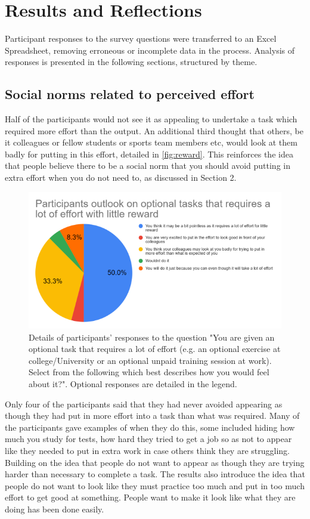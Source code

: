 \documentclass{l4proj}
\begin{document}
\section{Results and Reflections}
Participant responses to the survey questions were transferred to an Excel Spreadsheet, removing erroneous or incomplete data in the process. Analysis of responses is presented in the following sections, structured by theme.

\subsection{Social norms related to perceived effort}

Half of the participants would not see it as appealing to undertake a task which required more effort than the output. An additional third thought that others, be it colleagues or fellow students or sports team members etc, would look at them badly for putting in this effort, detailed in \autoref{fig:reward}. This reinforces the idea that people believe there to be a social norm that you should avoid putting in extra effort when you do not need to, as discussed in Section 2. 

\begin{figure}[h!]
    \centering
    \includegraphics[width=\textwidth]{images/littleReward.png}
        \caption{Details of participants' responses to the question "You are given an optional task that requires a lot of effort (e.g. an optional exercise at college/University or an optional unpaid training session at work). Select from the following which best describes how you would feel about it?". Optional responses are detailed in the legend.}
        \label{fig:reward}
\end{figure}

Only four of the participants said that they had never avoided appearing as though they had put in more effort into a task than what was required. Many of the participants gave examples of when they do this, some included hiding how much you study for tests, how hard they tried to get a job so as not to appear like they needed to put in extra work in case others think they are struggling. Building on the idea that people do not want to appear as though they are trying harder than necessary to complete a task. The results also introduce the idea that people do not want to look like they must practice too much and put in too much effort to get good at something. People want to make it look like what they are doing has been done easily. 
\end{document}
